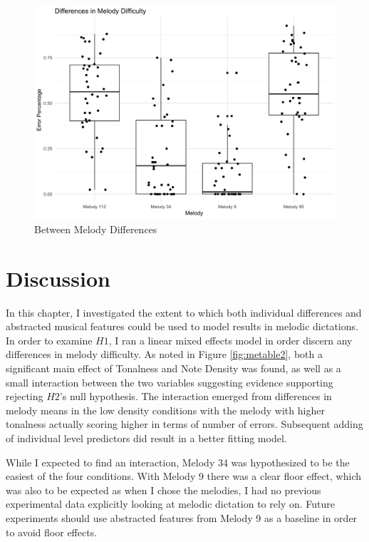 \documentclass[12pt,]{book}
\begin{document}
\begin{figure}

{\centering \includegraphics[width=1\linewidth]{img/melody_differences} 

}

\caption{Between Melody Differences}\label{fig:edistribution}
\end{figure}

\hypertarget{discussion-2}{%
\section{Discussion}\label{discussion-2}}

In this chapter, I investigated the extent to which both individual differences and abstracted musical features could be used to model results in melodic dictations.
In order to examine \(H1\), I ran a linear mixed effects model in order discern any differences in melody difficulty.
As noted in Figure \ref{fig:metable2}, both a significant main effect of Tonalness and Note Density was found, as well as a small interaction between the two variables suggesting evidence supporting rejecting \(H2\)'s null hypothesis.
The interaction emerged from differences in melody means in the low density conditions with the melody with higher tonalness actually scoring higher in terms of number of errors.
Subsequent adding of individual level predictors did result in a better fitting model.

While I expected to find an interaction, Melody 34 was hypothesized to be the easiest of the four conditions.
With Melody 9 there was a clear floor effect, which was also to be expected as when I chose the melodies, I had no previous experimental data explicitly looking at melodic dictation to rely on.
Future experiments should use abstracted features from Melody 9 as a baseline in order to avoid floor effects.
\end{document}
